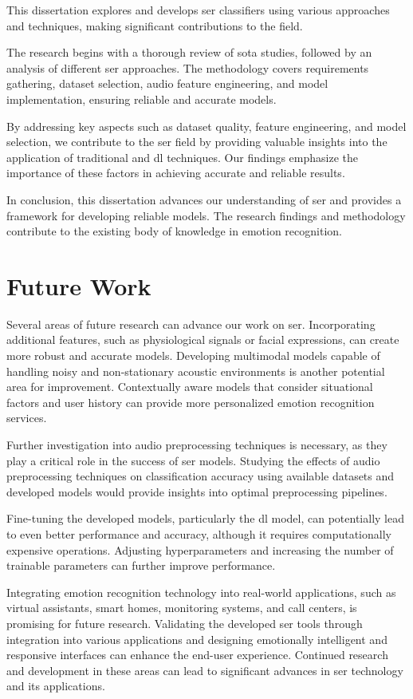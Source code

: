 This dissertation explores and develops \ac{ser} classifiers using various approaches and techniques, making significant contributions to the field.

The research begins with a thorough review of \ac{sota} studies, followed by an analysis of different \ac{ser} approaches. The methodology covers requirements gathering, dataset selection, audio feature engineering, and model implementation, ensuring reliable and accurate models.

By addressing key aspects such as dataset quality, feature engineering, and model selection, we contribute to the \ac{ser} field by providing valuable insights into the application of traditional and \ac{dl} techniques. Our findings emphasize the importance of these factors in achieving accurate and reliable results.

In conclusion, this dissertation advances our understanding of \ac{ser} and provides a framework for developing reliable models. The research findings and methodology contribute to the existing body of knowledge in emotion recognition.

\section{Future Work}

Several areas of future research can advance our work on \ac{ser}. Incorporating additional features, such as physiological signals or facial expressions, can create more robust and accurate models. Developing multimodal models capable of handling noisy and non-stationary acoustic environments is another potential area for improvement. Contextually aware models that consider situational factors and user history can provide more personalized emotion recognition services.

Further investigation into audio preprocessing techniques is necessary, as they play a critical role in the success of \ac{ser} models. Studying the effects of audio preprocessing techniques on classification accuracy using available datasets and developed models would provide insights into optimal preprocessing pipelines.

Fine-tuning the developed models, particularly the \ac{dl} model, can potentially lead to even better performance and accuracy, although it requires computationally expensive operations. Adjusting hyperparameters and increasing the number of trainable parameters can further improve performance.

Integrating emotion recognition technology into real-world applications, such as virtual assistants, smart homes, monitoring systems, and call centers, is promising for future research. Validating the developed \ac{ser} tools through integration into various applications and designing emotionally intelligent and responsive interfaces can enhance the end-user experience. Continued research and development in these areas can lead to significant advances in \ac{ser} technology and its applications.